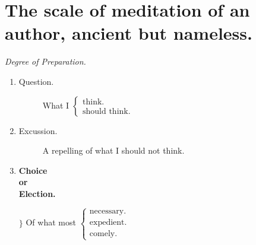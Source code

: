 \chapter{The scale of meditation of an author, ancient but nameless.}
\label{appendix:scale}
\begin{center}\emph{Degree of Preparation.}\end{center} \par
    \begin{enumerate}
        \item \begin{description}\item[Question.] What I $ \begin{cases} \text{think.} \\ \text{should think.} \end{cases} $ \end{description}
        \item \begin{description}\item[Excussion.] A repelling of what I should not think. \end{description}
        \item \parbox[c]{1.5cm}{\textbf{Choice\\or\\Election.}} \parbox[c]{10.5cm}{ $\Bigg\}$ Of what most $ \begin{cases} \text{necessary.} \\ \text{expedient.} \\ \text{comely.} \end{cases} $}
    \end{enumerate}

